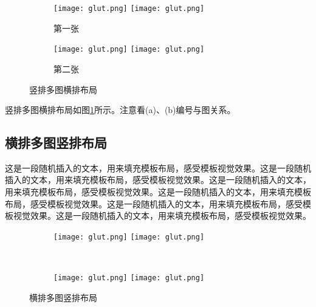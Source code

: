 \begin{figure}[!htb]
    \centering
    \begin{subfigure}[t]{0.13\linewidth}
        \captionsetup{justification=centering} 
        \begin{minipage}[b]{1\linewidth}
        \texttt{[image: glut.png]} \vspace{-1ex} \vfill
        \texttt{[image: glut.png]}
        \caption{第一张}
        \end{minipage}
    \end{subfigure}
    \begin{subfigure}[t]{0.13\linewidth}
        \captionsetup{justification=centering} 
        \begin{minipage}[b]{1\linewidth}
        \texttt{[image: glut.png]} \vspace{-1ex} \vfill
        \texttt{[image: glut.png]}
        \caption{第二张}
        \end{minipage}
    \end{subfigure}
    \caption{竖排多图横排布局}
    \label{F.glut_col_row}
\end{figure}

竖排多图横排布局如图\ref{F.glut_col_row}所示。注意看(a)、(b)编号与图关系。


\subsection{横排多图竖排布局}

    这是一段随机插入的文本，用来填充模板布局，感受模板视觉效果。这是一段随机插入的文本，用来填充模板布局，感受模板视觉效果。这是一段随机插入的文本，用来填充模板布局，感受模板视觉效果。这是一段随机插入的文本，用来填充模板布局，感受模板视觉效果。这是一段随机插入的文本，用来填充模板布局，感受模板视觉效果。这是一段随机插入的文本，用来填充模板布局，感受模板视觉效果。

\begin{figure}[!htb]
    \centering
    \begin{subfigure}[t]{0.3\linewidth}
        \captionsetup{justification=centering} 
        \begin{minipage}[b]{1\linewidth}
        \texttt{[image: glut.png]}
        \texttt{[image: glut.png]}
        \caption{}
        \end{minipage}
    \end{subfigure}\\
    \begin{subfigure}[t]{0.3\linewidth}
        \captionsetup{justification=centering} 
        \begin{minipage}[b]{1\linewidth}
        \texttt{[image: glut.png]}
        \texttt{[image: glut.png]}
        \caption{}
        \end{minipage}
    \end{subfigure}
    \caption{横排多图竖排布局}
    \label{F.glut_row_col}
\end{figure}

